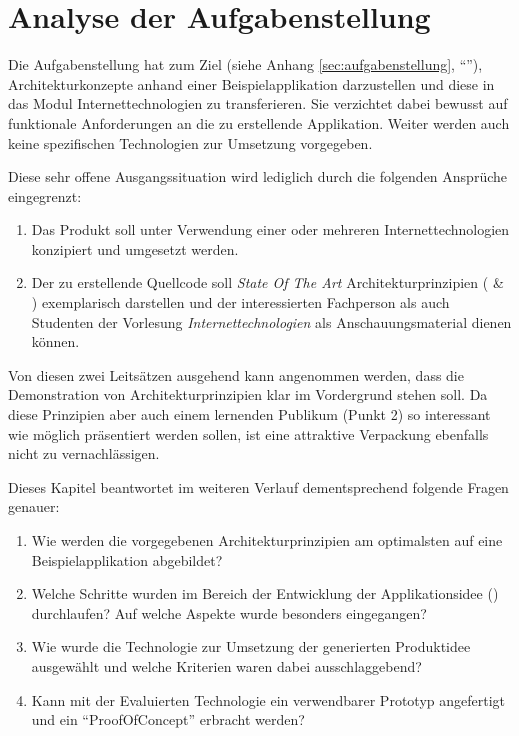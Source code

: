 \chapter{Analyse der Aufgabenstellung}
\label{sec:analyse-der-aufgabenstellung}

Die Aufgabenstellung hat zum Ziel (siehe Anhang \ref{sec:aufgabenstellung},
``''), Architekturkonzepte anhand einer
Beispielapplikation darzustellen und diese in das Modul Internettechnologien
zu transferieren. Sie verzichtet dabei bewusst auf funktionale Anforderungen
an die zu erstellende Applikation. Weiter werden auch keine spezifischen
Technologien zur Umsetzung vorgegeben.

Diese sehr offene Ausgangssituation wird lediglich durch die folgenden
Ansprüche eingegrenzt:

\begin{enumerate}
	\item Das Produkt soll unter Verwendung einer oder mehreren
		Internettechnologien konzipiert und umgesetzt werden.
	\item Der zu erstellende Quellcode soll \emph{State Of The Art}
		Architekturprinzipien (\cite{ROCA} \& \cite{TilkovSlides}) exemplarisch
		darstellen und der interessierten Fachperson als auch Studenten der
		Vorlesung \emph{Internettechnologien} als Anschauungsmaterial dienen können.
\end{enumerate}

Von diesen zwei Leitsätzen ausgehend kann angenommen werden, dass die
Demonstration von Architekturprinzipien klar im Vordergrund stehen soll.
Da diese Prinzipien aber auch einem lernenden Publikum (Punkt 2) so
interessant wie möglich präsentiert werden sollen, ist eine attraktive
Verpackung ebenfalls nicht zu vernachlässigen.

Dieses Kapitel beantwortet im weiteren Verlauf dementsprechend folgende Fragen genauer:

\begin{enumerate}
	\item Wie werden die vorgegebenen Architekturprinzipien am optimalsten
		auf eine Beispielapplikation abgebildet?
	\item Welche Schritte wurden im Bereich der Entwicklung der
		Applikationsidee ()
		durchlaufen? Auf welche Aspekte wurde besonders eingegangen?
	\item Wie wurde die Technologie zur Umsetzung der generierten
		Produktidee ausgewählt und welche Kriterien waren dabei ausschlaggebend?
	\item Kann mit der Evaluierten Technologie ein verwendbarer
		Prototyp angefertigt und ein ``\gls{ProofOfConcept}'' erbracht werden?
\end{enumerate}

\newpage


\newpage


\newpage


\newpage

